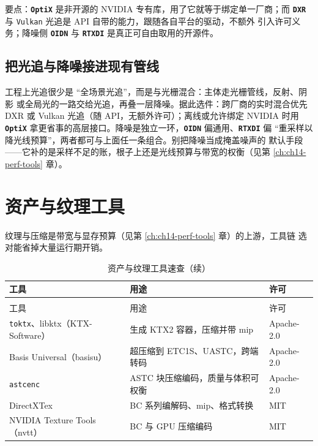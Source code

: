 \documentclass[12pt,a4paper,fontset=fandol]{ctexbook}
\newcommand{\Tp}[1]{\texttt{#1}}
\newcommand{\Lib}[1]{\textbf{\texttt{#1}}}
\begin{document}
要点：\Lib{OptiX} 是非开源的 NVIDIA 专有库，用了它就等于绑定单一厂商；而
\Lib{DXR} 与 \Tp{Vulkan} 光追是 API 自带的能力，跟随各自平台的驱动，不额外
引入许可义务；降噪侧 \Lib{OIDN} 与 \Lib{RTXDI} 是真正可自由取用的开源件。

\subsection{把光追与降噪接进现有管线}

工程上光追很少是 ``全场景光追''，而是与光栅混合：主体走光栅管线，反射、阴影
或全局光的一路交给光追，再叠一层降噪。据此选件：跨厂商的实时混合优先 DXR 或
Vulkan 光追（随 API，无额外许可）；离线或允许绑定 NVIDIA 时用 \Lib{OptiX}
拿更省事的高层接口。降噪是独立一环，\Lib{OIDN} 偏通用、\Lib{RTXDI} 偏
``重采样以降光线预算''，两者都可与上面任一条组合。别把降噪当成掩盖噪声的
默认手段——它补的是采样不足的账，根子上还是光线预算与带宽的权衡（见第
\ref{ch:ch14-perf-tools} 章）。

\section{资产与纹理工具}

纹理与压缩是带宽与显存预算（见第 \ref{ch:ch14-perf-tools} 章）的上游，工具链
选对能省掉大量运行期开销。

\begin{longtable}{>{\raggedright\arraybackslash}p{}
                  >{\raggedright\arraybackslash}p{}
                  >{\raggedright\arraybackslash}p{}}
\caption{资产与纹理工具速查}\label{tab:apC-asset} \\
\toprule
工具 & 用途 & 许可 \\
\midrule
\endfirsthead
\caption[]{资产与纹理工具速查（续）}\\
\toprule
工具 & 用途 & 许可 \\
\midrule
\endhead
\bottomrule
\endfoot
\Tp{toktx}、libktx（KTX-Software） & 生成 KTX2 容器，压缩并带 mip & Apache-2.0 \\
Basis Universal（basisu） & 超压缩到 ETC1S、UASTC，跨端转码 & Apache-2.0 \\
\Tp{astcenc} & ASTC 块压缩编码，质量与体积可权衡 & Apache-2.0 \\
DirectXTex & BC 系列编解码、mip、格式转换 & MIT \\
NVIDIA Texture Tools（nvtt） & BC 与 GPU 压缩编码 & MIT \\
\end{longtable}
\end{document}
